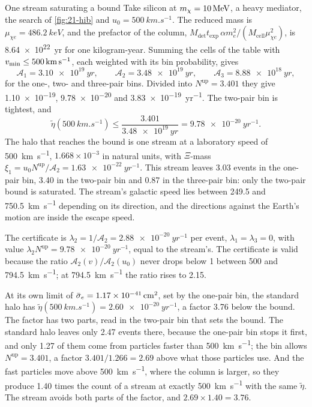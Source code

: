 \begin{workedexample}{One stream saturating a bound}\label{we:21-stream}
Take silicon at $m_{\chi} = \SI{10}{MeV}$, a heavy mediator, the search of \cref{fig:21-hib} and $u_0 = \SI{500}{km.s^{-1}}$. The reduced mass is $\mu_{\chi e} = \SI{486.2}{keV}$, and the prefactor of the column, $M_{\mathrm{det}}t_{\mathrm{exp}}\,\alpha m_e^2/(M_{\mathrm{cell}}\mu_{\chi e}^2)$, is \SI{8.64e22}{yr} for one kilogram-year. Summing the cells of the table with $v_{\mathrm{min}} \le \SI{500}{km.s^{-1}}$, each weighted with its bin probability, gives
\begin{equation*}
  \mathcal{A}_1 = \SI{3.10e19}{yr} , \qquad \mathcal{A}_2 = \SI{3.48e19}{yr} , \qquad \mathcal{A}_3 = \SI{8.88e18}{yr} ,
\end{equation*}
for the one-, two- and three-pair bins. Divided into $N^{\mathrm{up}} = 3.401$ they give \num{1.10e-19}, \num{9.78e-20} and \SI{3.83e-19}{yr^{-1}}. The two-pair bin is tightest, and
\begin{equation*}
  \tilde\eta(\SI{500}{km.s^{-1}}) \le \frac{3.401}{\SI{3.48e19}{yr}} = \SI{9.78e-20}{yr^{-1}} .
\end{equation*}
The halo that reaches the bound is one stream at a laboratory speed of \SI{500}{km.s^{-1}}, $1.668\times10^{-3}$ in natural units, with $\Xi$-mass $\xi_1 = u_0N^{\mathrm{up}}/\mathcal{A}_2 = \SI{1.63e-22}{yr^{-1}}$. This stream leaves 3.03 events in the one-pair bin, 3.40 in the two-pair bin and 0.87 in the three-pair bin: only the two-pair bound is saturated. The stream's galactic speed lies between \num{249.5} and \SI{750.5}{km.s^{-1}} depending on its direction, and the directions against the Earth's motion are inside the escape speed.

The certificate is $\lambda_2 = 1/\mathcal{A}_2 = \SI{2.88e-20}{yr^{-1}}$ per event, $\lambda_1 = \lambda_3 = 0$, with value $\lambda_2N^{\mathrm{up}} = \SI{9.78e-20}{yr^{-1}}$, equal to the stream's. The certificate is valid because the ratio $\mathcal{A}_2(v)/\mathcal{A}_2(u_0)$ never drops below 1 between \num{500} and \SI{794.5}{km.s^{-1}}; at \SI{794.5}{km.s^{-1}} the ratio rises to 2.15.

At its own limit of $\bar{\sigma}_{e} = \SI{1.17e-41}{cm^2}$, set by the one-pair bin, the standard halo has $\tilde\eta(\SI{500}{km.s^{-1}}) = \SI{2.60e-20}{yr^{-1}}$, a factor 3.76 below the bound. The factor has two parts, read in the two-pair bin that sets the bound. The standard halo leaves only 2.47 events there, because the one-pair bin stops it first, and only 1.27 of them come from particles faster than \SI{500}{km.s^{-1}}; the bin allows $N^{\mathrm{up}} = 3.401$, a factor $3.401/1.266 = 2.69$ above what those particles use. And the fast particles move above \SI{500}{km.s^{-1}}, where the column is larger, so they produce 1.40 times the count of a stream at exactly \SI{500}{km.s^{-1}} with the same $\tilde\eta$. The stream avoids both parts of the factor, and $2.69 \times 1.40 = 3.76$.
\end{workedexample}

